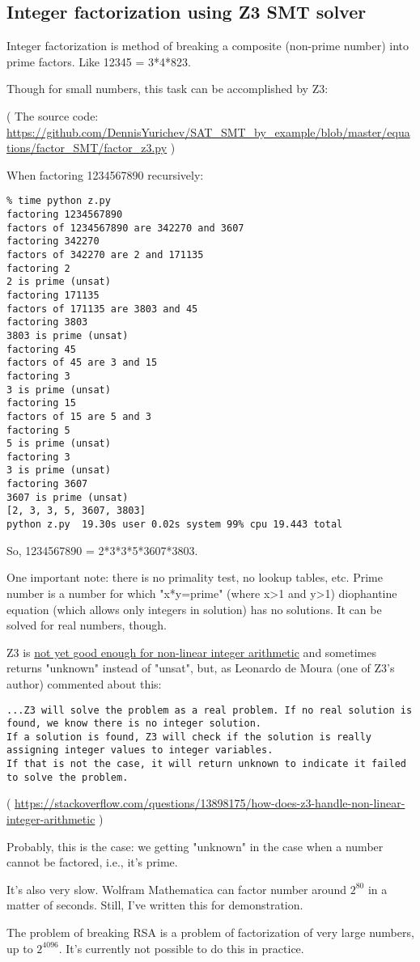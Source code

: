 \subsection{Integer factorization using Z3 SMT solver}
\label{factor_Z3}

Integer factorization is method of breaking a composite (non-prime number) into prime factors.
Like 12345 = 3*4*823.

Though for small numbers, this task can be accomplished by Z3:



( The source code: \url{https://github.com/DennisYurichev/SAT_SMT_by_example/blob/master/equations/factor_SMT/factor_z3.py} )

When factoring 1234567890 recursively:

\begin{lstlisting}
% time python z.py
factoring 1234567890
factors of 1234567890 are 342270 and 3607
factoring 342270
factors of 342270 are 2 and 171135
factoring 2
2 is prime (unsat)
factoring 171135
factors of 171135 are 3803 and 45
factoring 3803
3803 is prime (unsat)
factoring 45
factors of 45 are 3 and 15
factoring 3
3 is prime (unsat)
factoring 15
factors of 15 are 5 and 3
factoring 5
5 is prime (unsat)
factoring 3
3 is prime (unsat)
factoring 3607
3607 is prime (unsat)
[2, 3, 3, 5, 3607, 3803]
python z.py  19.30s user 0.02s system 99% cpu 19.443 total
\end{lstlisting}

So, 1234567890 = 2*3*3*5*3607*3803.

One important note: there is no primality test, no lookup tables, etc.
Prime number is a number for which "x*y=prime" (where x>1 and y>1) diophantine equation (which allows only integers in solution) has no solutions.
It can be solved for real numbers, though.

Z3 is \href{https://github.com/Z3Prover/z3/issues/1264}{not yet good enough for non-linear integer arithmetic}
and sometimes returns "unknown" instead of "unsat", but,
as Leonardo de Moura (one of Z3's author) commented about this:

\begin{lstlisting}
...Z3 will solve the problem as a real problem. If no real solution is found, we know there is no integer solution.
If a solution is found, Z3 will check if the solution is really assigning integer values to integer variables.
If that is not the case, it will return unknown to indicate it failed to solve the problem.
\end{lstlisting}
( \url{https://stackoverflow.com/questions/13898175/how-does-z3-handle-non-linear-integer-arithmetic} )

Probably, this is the case: we getting "unknown" in the case when a number cannot be factored, i.e., it's prime.

It's also very slow. Wolfram Mathematica can factor number around $2^{80}$ in a matter of seconds.
Still, I've written this for demonstration.

The problem of breaking \ac{RSA} is a problem of factorization of very large numbers, up to $2^{4096}$.
It's currently not possible to do this in practice.

